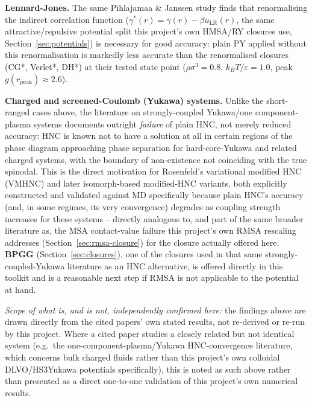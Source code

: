 \documentclass[11pt,a4paper]{article}
\begin{document}
\textbf{Lennard-Jones.} The same Pihlajamaa \& Janssen study
\cite{PihlajamaaJanssen2024} finds that renormalising the indirect correlation
function ($\gamma^*(r)=\gamma(r)-\beta u_{\mathrm{LR}}(r)$, the same
attractive/repulsive potential split this project's own HMSA/RY closures
use, Section~\ref{sec:potentials}) is necessary for good accuracy: plain PY
applied without this renormalisation is markedly less accurate than the
renormalised closures (CG*, Verlet*, DH*) at their tested state point
($\rho\sigma^3=0.8$, $k_BT/\varepsilon=1.0$, peak $g(r_{\mathrm{peak}})\approx2.6$).

\textbf{Charged and screened-Coulomb (Yukawa) systems.} Unlike the
short-ranged cases above, the literature on strongly-coupled Yukawa/one
component-plasma systems documents outright \emph{failure} of plain HNC,
not merely reduced accuracy: HNC is known not to have a solution at all in
certain regions of the phase diagram approaching phase separation for
hard-core-Yukawa and related charged systems, with the boundary of
non-existence not coinciding with the true spinodal. This is the direct
motivation for Rosenfeld's variational modified HNC (VMHNC)
\cite{rosenfeld1986} and later isomorph-based modified-HNC variants, both
explicitly constructed and validated against MD specifically because plain
HNC's accuracy (and, in some regimes, its very convergence) degrades as
coupling strength increases for these systems -- directly analogous to, and
part of the same broader literature as, the MSA contact-value failure this
project's own RMSA rescaling addresses (Section~\ref{sec:rmsa-closure}) for
the closure actually offered here. \textbf{BPGG}
(Section~\ref{sec:closures}), one of the closures used in that same
strongly-coupled-Yukawa literature as an HNC alternative, is offered
directly in this toolkit and is a reasonable next step if RMSA is not
applicable to the potential at hand.

\emph{Scope of what is, and is not, independently confirmed here:} the
findings above are drawn directly from the cited papers' own stated
results, not re-derived or re-run by this project. Where a cited paper
studies a closely related but not identical system (e.g.\ the
one-component-plasma/Yukawa HNC-convergence literature, which concerns bulk
charged fluids rather than this project's own colloidal DLVO/HS3Yukawa
potentials specifically), this is noted as such above rather than presented
as a direct one-to-one validation of this project's own numerical results.
\end{document}
